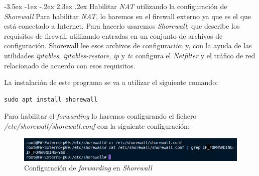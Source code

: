 \documentclass[11pt]{report}
\makeatletter
\renewcommand\chapter{\@startsection{chapter}{0}{\z@}%
    {-3.5ex \@plus -1ex \@minus -.2ex}%
    {2.3ex \@plus.2ex}%
    {\normalfont\Large\bfseries}}
\makeatother
\begin{document}
\cleardoublepage

\chapter{Habilitar \emph{NAT} utilizando la configuración de \emph{Shorewall}}
Para habilitar \emph{NAT}, lo haremos en el firewall externo ya que es el que está conectado 
a Internet. Para hacerlo usaremos \emph{Shorewall}, que describe los requisitos de firewall utilizando entradas en un 
conjunto de archivos de configuración. Shorewall lee esos archivos de configuración y, 
con la ayuda de las utilidades \emph{iptables}, \emph{iptables-restore}, \emph{ip} y \emph{tc} configura 
el \emph{Netfilter} y el tráfico de red relacionado de acuerdo con esos requisitos.

La instalación de este programa se va a utilizar el siguiente comando:
\begin{BVerbatim}
sudo apt install shorewall
\end{BVerbatim}

Para habilitar el \emph{forwarding} lo haremos configurando el
fichero \emph{/etc/shorewall/shorewall.conf} con la siguiente configuración:
\begin{figure}[H]
  \centering
  \includegraphics[scale=0.8]{img/forwarding_shorewall.png}
  \caption{Configuración de \emph{forwarding} en \emph{Shorewall}}
  \label{fig:Configuracion de forwarding en Shorewall}
\end{figure}
\end{document}
